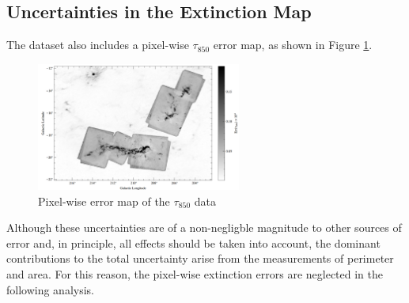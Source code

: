 \subsection{Uncertainties in the Extinction Map}

The dataset also includes a pixel-wise $\tau_{850}$ error map, as shown in Figure \ref{fig:error_map}. 

\begin{figure}[t]
    \centering
    \includegraphics[width=0.6\textwidth]{figures/error_map.png}
    \caption{Pixel-wise error map of the $\tau_{850}$ data \cite{lombardi2014herschel}}
    \label{fig:error_map}
\end{figure}

Although these uncertainties are of a non-negligble magnitude to other sources of error and, in principle, all effects should be taken into account, the dominant contributions to the total uncertainty arise from the measurements of perimeter and area. 
For this reason, the pixel-wise extinction errors are neglected in the following analysis.
